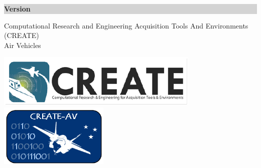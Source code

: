 \begin{titlepage}
  \thispagestyle{empty}

  \begin{flushright}

    \colorbox{lightGray}
      {\begin{minipage}[c]{2.0in}
        \begin{center}
          \vspace{6pt}
          \textbf{\Large{Version}} \\
          \vspace{8pt}
          \textcolor{white}{\fontsize{90}{100}\bfseries \codeversion}
          \vspace{6pt}
        \end{center}  
      \end{minipage}}

  \end{flushright}

  \vspace{0.25in}

  \begin{flushleft}
    
    \huge { Computational Research and Engineering 
    Acquisition Tools And Environments (CREATE) }
    \Hrule{1.0pt} \\
    \Huge Air Vehicles

  \end{flushleft}

  \vspace{0.75in}
  
  \begin{centering}

    \includegraphics[height=0.085\textheight]{createLogo.pdf} 
    \hfill
    \includegraphics[height=0.085\textheight]{createAVLogo.pdf}

  \end{centering}


\end{titlepage}
